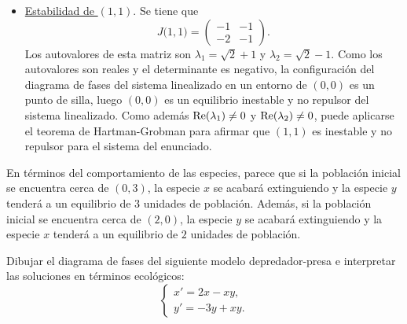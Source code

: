 \documentclass[11pt]{report}
\begin{document}
\begin{solution}
\begin{itemize}
        \item \underline{Estabilidad de $(1,1)$}. Se tiene que
        \[J\bigl(1,1\bigr) = \left(\begin{array}{cc}
            -1 & -1 \\
            -2 & -1
        \end{array}\right).\]
        Los autovalores de esta matriz son $\lambda_1 =\sqrt{2}+1$ y $\lambda_2 = \sqrt{2}-1$. Como los autovalores son reales y el determinante es negativo, la configuración del diagrama de fases del sistema linealizado en un entorno de $(0,0)$ es un punto de silla, luego $(0,0)$ es un equilibrio inestable y no repulsor del sistema linealizado. Como además $\textup{Re}(\lambda_1)\neq0$ y $\textup{Re}(\lambda_2)\neq0$, puede aplicarse el teorema de Hartman-Grobman para afirmar que $(1,1)$ es inestable y no repulsor para el sistema del enunciado.
    \end{itemize}

    En términos del comportamiento de las especies, parece que si la población inicial se encuentra cerca de $(0,3)$, la especie $x$ se acabará extinguiendo y la especie $y$ tenderá a un equilibrio de $3$ unidades de población. Además, si la población inicial se encuentra cerca de $(2,0)$, la especie $y$ se acabará extinguiendo y la especie $x$ tenderá a un equilibrio de $2$ unidades de población. 
\end{solution}

\begin{exercise}
    Dibujar el diagrama de fases del siguiente modelo depredador-presa e interpretar las soluciones en términos ecológicos:
    \[\begin{cases}
        x' = 2x-xy, \\
        y' = -3y+xy.
    \end{cases}\]
\end{exercise}
\end{document}
